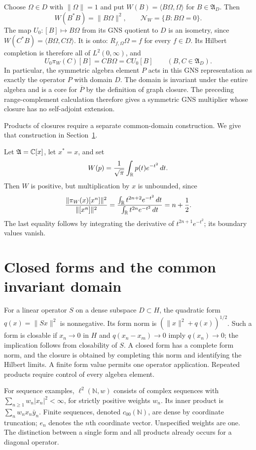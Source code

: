 Choose $\Omega\in D$ with $\|\Omega\|=1$ and put
$W(B)=\langle B\Omega,\Omega\rangle$ for $B\in\mathfrak A_D$.
Then
\[
 W(B^*B)=\|B\Omega\|^2,\qquad
 \mathcal N_W=\{B:B\Omega=0\}.
\]
The map $U_0:[B]\mapsto B\Omega$ from its GNS quotient to $D$ is an
isometry, since
$W(C^*B)=\langle B\Omega,C\Omega\rangle$.
It is onto: $R_{f,\Omega}\Omega=f$ for every $f\in D$.
Its Hilbert completion is therefore all of $L^2(0,\infty)$, and
\[
 U_0\pi_W(C)[B]=CB\Omega=C U_0[B]
 \qquad(B,C\in\mathfrak A_D).
\]
In particular, the symmetric algebra element $P$ acts in this GNS
representation as exactly the operator $P$ with domain $D$.
The domain is invariant under the entire algebra and is a core for
$\overline P$ by the definition of graph closure.  The preceding
range-complement calculation therefore gives a symmetric GNS multiplier
whose closure has no self-adjoint extension.

Products of closures require a separate common-domain construction.
We give that construction in Section~\ref{sec:graph-domain}.

\begin{example}
Let $\mathfrak A=\mathbb C[x]$, let $x^*=x$, and set
\[
 W(p)=\frac1{\sqrt\pi}\int_{\mathbb R}p(t)e^{-t^2}\,dt.
\]
Then $W$ is positive, but multiplication by $x$ is unbounded, since
\[
 \frac{\|\pi_W(x)[x^n]\|^2}{\|[x^n]\|^2}
 =\frac{\int_{\mathbb R}t^{2n+2}e^{-t^2}\,dt}
        {\int_{\mathbb R}t^{2n}e^{-t^2}\,dt}
 =n+\frac12.
\]
The last equality follows by integrating the derivative of
$t^{2n+1}e^{-t^2}$; its boundary values vanish.
\end{example}

\section{Closed forms and the common invariant domain}
\label{sec:graph-domain}

For a linear operator $S$ on a dense subspace $D\subset H$, the quadratic
form $q(x)=\|Sx\|^2$ is nonnegative.  Its form norm is
$(\|x\|^2+q(x))^{1/2}$.  Such a form is closable if $x_n\to0$ in $H$ and
$q(x_n-x_m)\to0$ imply $q(x_n)\to0$; the implication follows from
closability of $S$.  A closed form has a complete form norm, and the closure
is obtained by completing this norm and identifying the Hilbert limits.
A finite form value permits one operator application.  Repeated products
require control of every algebra element.

For sequence examples, $\ell^2(\mathbb N,w)$ consists of complex sequences
with $\sum_{n\geq1}w_n|x_n|^2<\infty$, for strictly positive weights $w_n$.
Its inner product is $\sum_n w_nx_n\bar y_n$.  Finite sequences, denoted
$c_{00}(\mathbb N)$, are dense by coordinate truncation; $e_n$ denotes the
$n$th coordinate vector.  Unspecified weights are one.
The distinction between a single form and all products already occurs for
a diagonal operator.

